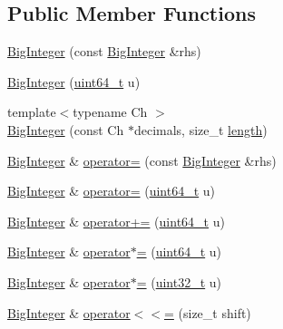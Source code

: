 \subsection*{Public Member Functions}
\begin{DoxyCompactItemize}
\item 
\hyperlink{classinternal_1_1BigInteger_abec623168bc9494dec2f50643b897f72}{Big\+Integer} (const \hyperlink{classinternal_1_1BigInteger}{Big\+Integer} \&rhs)
\item 
\hyperlink{classinternal_1_1BigInteger_ad02b0ef9da203efddd4af07e923732c0}{Big\+Integer} (\hyperlink{stdint_8h_aec6fcb673ff035718c238c8c9d544c47}{uint64\+\_\+t} u)
\item 
{\footnotesize template$<$typename Ch $>$ }\\\hyperlink{classinternal_1_1BigInteger_a4dc2632b2aa2973d18864a127d7c141a}{Big\+Integer} (const Ch $\ast$decimals, size\+\_\+t \hyperlink{imgui__impl__opengl3__loader_8h_a011fc24f10426c01349e94a4edd4b0d5}{length})
\item 
\hyperlink{classinternal_1_1BigInteger}{Big\+Integer} \& \hyperlink{classinternal_1_1BigInteger_ae3eaf1b96cd993511c9f48a14dfc3af2}{operator=} (const \hyperlink{classinternal_1_1BigInteger}{Big\+Integer} \&rhs)
\item 
\hyperlink{classinternal_1_1BigInteger}{Big\+Integer} \& \hyperlink{classinternal_1_1BigInteger_a4002e0b1cf5ee68ab94ab65b35167a38}{operator=} (\hyperlink{stdint_8h_aec6fcb673ff035718c238c8c9d544c47}{uint64\+\_\+t} u)
\item 
\hyperlink{classinternal_1_1BigInteger}{Big\+Integer} \& \hyperlink{classinternal_1_1BigInteger_a09af1d6658d51ad4372649ce1c9c1a62}{operator+=} (\hyperlink{stdint_8h_aec6fcb673ff035718c238c8c9d544c47}{uint64\+\_\+t} u)
\item 
\hyperlink{classinternal_1_1BigInteger}{Big\+Integer} \& \hyperlink{classinternal_1_1BigInteger_a79a52c6135c9783f2e53432dce2cde89}{operator$\ast$=} (\hyperlink{stdint_8h_aec6fcb673ff035718c238c8c9d544c47}{uint64\+\_\+t} u)
\item 
\hyperlink{classinternal_1_1BigInteger}{Big\+Integer} \& \hyperlink{classinternal_1_1BigInteger_a83e8e464b7bc31c8b2c943f8563b2226}{operator$\ast$=} (\hyperlink{stdint_8h_a435d1572bf3f880d55459d9805097f62}{uint32\+\_\+t} u)
\item 
\hyperlink{classinternal_1_1BigInteger}{Big\+Integer} \& \hyperlink{classinternal_1_1BigInteger_a48b12ef4676f19290dfd5816a4ef4a88}{operator$<$$<$=} (size\+\_\+t shift)
\item 

\end{DoxyCompactItemize}
